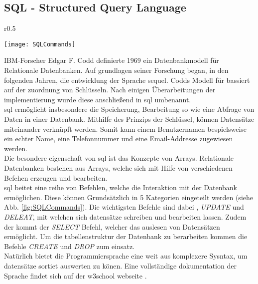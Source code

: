 \subsection{SQL - Structured Query Language}
\begin{wrapfigure}{r}{0.5\textwidth}
    \vspace{-1.2cm}
    \begin{center}
      \texttt{[image: SQLCommands]}
    \end{center}
    \vspace{-0.5cm}
    \caption{SQL Befehls Kategorien \cite{SQLCommands}}
    \label{fig:SQLCommands}
    \vspace{-0.5cm}
  \end{wrapfigure}
IBM-Forscher Edgar F. Codd definierte 1969 ein Datenbankmodell für Relationale Datenbanken. Auf grundlagen seiner Forschung began, in den folgenden Jahren, die entwicklung der Sprache \ac{sequel}. Codds Modell für bassiert auf der zuordnung von Schlüsseln. Nach einigen Überarbeitungen der implementierung wurde diese anschließend in \ac{sql} umbenannt.\\
\ac{sql} ermöglicht insbesondere die Speicherung, Bearbeitung so wie eine Abfrage von Daten in einer Datenbank. Mithilfe des Prinzips der Schlüssel, können Datensätze miteinander verknüpft werden. Somit kann einem Benutzernamen bespielsweise ein echter Name, eine Telefonnummer und eine Email-Addresse zugewiesen werden.\\
Die besondere eigenschaft von \ac{sql} ist das Konzepte von Arrays. Relationale Datenbanken bestehen aus Arrays, welche sich mit Hilfe von verschiedenen Befehen erzeugen und bearbeiten. \cite{SQL}\\
\ac{sql} beitet eine reihe von Befehlen, welche die Interaktion mit der Datenbank ermöglichen. Diese können Grundsätzlich in 5 Kategorien eingeteilt werden (siehe Abb. \ref{fig:SQLCommands}). Die wichtigsten Befehle sind dabei , \textit{UPDATE} und \textit{DELEAT}, mit welchen sich datensätze schreiben und bearbeiten lassen. Zudem der kommt der \textit{SELECT} Befehl, welcher das auslesen von Datensätzen ermöglicht. Um die tabellenstruktur der Datenbank zu berarbeiten kommen die Befehle \textit{CREATE} und \textit{DROP} zum einsatz. \cite{SQLCommands}\\
Natürlich bietet die Programmiersprache eine weit aus komplexere Sysntax, um datensätze sortiet auswerten zu könen. Eine vollständige dokumentation der Sprache findet sich auf der w3school webseite \cite{SQLDoku}.

